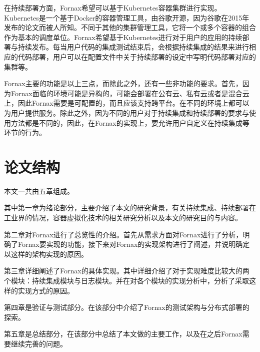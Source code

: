 在持续部署方面，Fornax希望可以基于Kubernetes容器集群进行实现。Kubernetes是一个基于Docker的容器管理工具，由谷歌开源，因为谷歌在2015年发布的论文\cite{Borg}而被人所知。不同于其他的集群管理工具，它将一个或多个容器的组合作为基本的调度单位。Fornax希望基于Kubernetes进行对于用户的应用的持续部署与持续发布。每当用户代码的集成测试结束后，会根据持续集成的结果来进行相应的代码部署，用户可以在配置文件中关于持续部署的设定中写明代码部署对应的集群等。

Fornax主要的功能是以上三点，而除此之外，还有一些非功能的要求。首先，因为Fornax面临的环境可能是异构的，可能会部署在公有云、私有云或者是混合云上，因此Fornax需要是可配置的，而且应该支持跨平台。在不同的环境上都可以为用户提供服务。除此之外，因为不同的用户对于持续集成和持续部署的要求与使用方法都是不同的，因此，在Fornax的实现上，要允许用户自定义在持续集成等环节的行为。

\section{论文结构}

本文一共由五章组成。

其中第一章为绪论部分，主要介绍了本文的研究背景，有关持续集成、持续部署在工业界的情况，容器虚拟化技术的相关研究分析以及本文的研究目的与内容。

第二章对Fornax进行了总览性的介绍。首先从需求方面对Fornax进行了分析，明确了Fornax要实现的功能，接下来对Fornax的实现架构进行了阐述，并说明确定以这样的架构实现的原因。

第三章详细阐述了Fornax的具体实现。其中详细介绍了对于实现难度比较大的两个模块：持续集成模块与日志模块。并在对各个模块的实现分析中，分析了采取这样的实现方式的原因。

第四章是验证与测试部分。在该部分中介绍了Fornax的测试架构与分布式部署的探索。

第五章是总结部分，在该部分中总结了本文做的主要工作，以及在之后Fornax需要继续完善的问题。